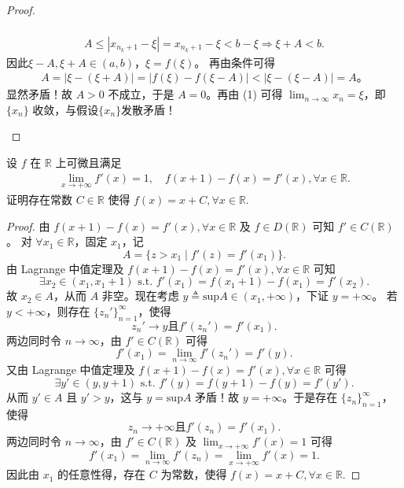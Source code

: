 \documentclass[../../main.tex]{subfiles}%
\begin{document}
\begin{proof}
\begin{enumerate}[(1)]
\begin{enumerate}[(i)]
\begin{gather*}
\\
A\leqslant | x_{n_k+1}-\xi |=x_{n_k+1}-\xi <b-\xi \Longrightarrow \xi +A<b.
\end{gather*}
因此$\xi -A,\xi +A\in (a,b)$，$\xi =f(\xi)$。
再由条件可得
\begin{align*}
A = |\xi - (\xi + A)| = |f(\xi) - f(\xi - A)| < |\xi - (\xi - A)| = A。
\end{align*}
显然矛盾！故 $A > 0$ 不成立，于是 $A = 0$。再由 (1) 可得 $\lim_{n \to \infty} x_n = \xi$，即 $\{x_n\}$ 收敛，与假设$\{x_n\}$发散矛盾！
\end{enumerate}
\end{enumerate}
\end{proof}

\begin{proposition}[时滞方程]\label{proposition:时滞方程}
设 $f$ 在 $\mathbb{R}$ 上可微且满足
\begin{align*}
\lim_{x \to +\infty} f'(x) = 1, \quad
f(x+1) - f(x) = f'(x), \forall x \in \mathbb{R}.
\end{align*}
证明存在常数 $C \in \mathbb{R}$ 使得 $f(x) = x + C, \forall x \in \mathbb{R}$.
\end{proposition}
\begin{proof}
由 \( f(x+1)-f(x)=f'(x),\forall x\in \mathbb{R} \) 及 \( f\in D(\mathbb{R}) \) 可知 \( f' \in C(\mathbb{R}) \)。
对 \(\forall x_1\in \mathbb{R} \)，固定 \( x_1 \)，记
\[ A=\{ z>x_1 \mid f'(z) = f'(x_1) \} .\]
由 Lagrange 中值定理及 \( f(x+1)-f(x)=f'(x),\forall x\in \mathbb{R} \) 可知
\[ \exists x_2\in (x_1,x_1+1) \,\,\mathrm{s}.\mathrm{t}.\,\, f'(x_1) = f(x_1+1) - f(x_1) = f'(x_2) .\]
故 \( x_2 \in A \)，从而 \( A \) 非空。现在考虑 \( y \triangleq \mathrm{sup}A \in (x_1,+\infty) \)，下证 \( y=+\infty \)。
若 \( y<+\infty \)，则存在 \(\{ z_{n}' \}_{n=1}^{\infty} \)，使得
\[ z_{n}' \rightarrow y \text{且} f'(z_{n}') = f'(x_1) .\]
两边同时令 \( n \rightarrow \infty \)，由 \( f' \in C(\mathbb{R}) \) 可得
\[ f'(x_1) = \lim_{n \rightarrow \infty} f'(z_{n}') = f'(y) .\]
又由 Lagrange 中值定理及 \( f(x+1)-f(x)=f'(x),\forall x\in \mathbb{R} \) 可得
\[ \exists y' \in (y,y+1) \,\,\mathrm{s}.\mathrm{t}.\,\, f'(y) = f(y+1) - f(y) = f'(y') .\]
从而 \( y' \in A \) 且 \( y' > y \)，这与 \( y=\mathrm{sup}A \) 矛盾！故 \( y=+\infty \)。于是存在 \(\{ z_n \}_{n=1}^{\infty} \)，使得
\[ z_n \rightarrow +\infty \text{且} f'(z_n) = f'(x_1) .\]
两边同时令 \( n \rightarrow \infty \)，由 \( f' \in C(\mathbb{R}) \) 及 \(\lim_{x \rightarrow +\infty} f'(x) = 1 \) 可得
\[ f'(x_1) = \lim_{n \rightarrow \infty} f'(z_n) = \lim_{x \rightarrow +\infty} f'(x) = 1 .\]
因此由 \( x_1 \) 的任意性得，存在 \( C \) 为常数，使得 \( f(x) = x+C,\forall x\in \mathbb{R} \).
\end{proof}
\end{document}
